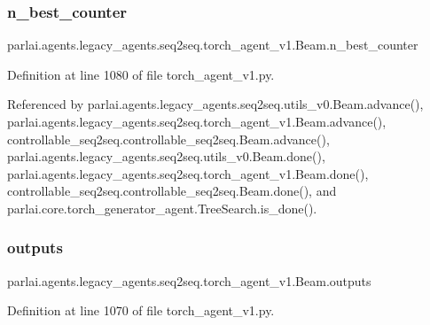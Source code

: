 \subsubsection{\texorpdfstring{n\+\_\+best\+\_\+counter}{n\_best\_counter}}
{\footnotesize\ttfamily parlai.\+agents.\+legacy\+\_\+agents.\+seq2seq.\+torch\+\_\+agent\+\_\+v1.\+Beam.\+n\+\_\+best\+\_\+counter}



Definition at line 1080 of file torch\+\_\+agent\+\_\+v1.\+py.



Referenced by parlai.\+agents.\+legacy\+\_\+agents.\+seq2seq.\+utils\+\_\+v0.\+Beam.\+advance(), parlai.\+agents.\+legacy\+\_\+agents.\+seq2seq.\+torch\+\_\+agent\+\_\+v1.\+Beam.\+advance(), controllable\+\_\+seq2seq.\+controllable\+\_\+seq2seq.\+Beam.\+advance(), parlai.\+agents.\+legacy\+\_\+agents.\+seq2seq.\+utils\+\_\+v0.\+Beam.\+done(), parlai.\+agents.\+legacy\+\_\+agents.\+seq2seq.\+torch\+\_\+agent\+\_\+v1.\+Beam.\+done(), controllable\+\_\+seq2seq.\+controllable\+\_\+seq2seq.\+Beam.\+done(), and parlai.\+core.\+torch\+\_\+generator\+\_\+agent.\+Tree\+Search.\+is\+\_\+done().

\mbox{\label{classparlai_1_1agents_1_1legacy__agents_1_1seq2seq_1_1torch__agent__v1_1_1Beam_a13bd578395eeca81c0d1712e220c4b37}} 
\subsubsection{\texorpdfstring{outputs}{outputs}}
{\footnotesize\ttfamily parlai.\+agents.\+legacy\+\_\+agents.\+seq2seq.\+torch\+\_\+agent\+\_\+v1.\+Beam.\+outputs}



Definition at line 1070 of file torch\+\_\+agent\+\_\+v1.\+py.



